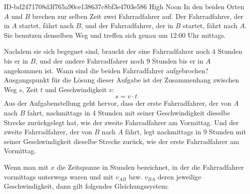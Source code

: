 \begin{exercise}
      {ID-bd2471708d3f765a90ce138637c8bf3e4703e586}
      {High Noon}
  \ifproblem\problem
    In den beiden Orten $A$ und $B$ brechen zur selben Zeit zwei Fahrradfahrer auf.
    Der Fahrradfahrer, der in $A$ startet, fährt nach $B$, und der Fahrradfahrer, der
    in $B$ startet, fährt nach $A$. Sie benutzen denselben Weg und treffen sich genau um
    12:00 Uhr mittags.
    \begin{center}
    \end{center}
    Nachdem sie sich begegnet sind, braucht der eine Fahrradfahrer noch 4
    Stunden bis er in $B$, und der andere Fahrradfahrer noch 9 Stunden bis
    er in $A$ angekommen ist. Wann sind die beiden Fahrradfahrer aufgebrochen?
  \fi
  \ifoutline\outline
    Ausgangspunkt für die Lösung dieser Aufgabe ist der Zusammenhang
    zwischen Weg $s$, Zeit $t$ und Geschwindigkeit $v$:
    \begin{equation*}
      s=v\cdot t
    \end{equation*}
    Aus der Aufgabenstellung geht hervor, dass der erste Fahrradfahrer,
    der von $A$ nach $B$ fahrt, nachmittags in 4 Stunden mit seiner
    Geschwindigkeit dieselbe Strecke zurückgelegt hat, wie der zweite
    Fahrradfahrer am Vormittag.
    Und der zweite Fahrradfahrer, der von $B$ nach $A$ fährt, legt
    nachmittags in 9 Stunden mit seiner Geschwindigkeit dieselbe Strecke
    zurück, wie der erste Fahrradfahrer am Vormittag.\par
    Wenn man mit $x$ die Zeitspanne in Stunden bezeichnet, in der die
    Fahrradfahrer vormittags unterwegs waren und mit $v_{AB}$ bzw.
    $v_{BA}$ deren jeweilige Geschwindigkeit, dann gilt folgendes
    Gleichungssystem:
    \begin{equation*}

\end{equation*}
\end{exercise}
